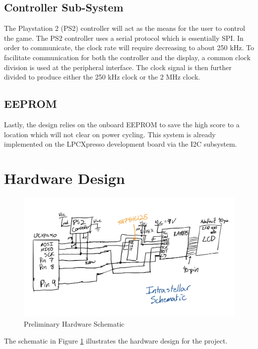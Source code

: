 \documentclass[a4paper, 12pt]{article}
\begin{document}
\subsection*{Controller Sub-System}
The Playstation 2 (PS2) controller will act as the means for the user to control the game. The PS2 controller uses a serial protocol which is essentially SPI. In order to communicate, the clock rate will require decreasing to about 250 kHz. To facilitate communication for both the controller and the display, a common clock division is used at the peripheral interface. The clock signal is then further divided to produce either the 250 kHz clock or the 2 MHz clock.

\subsection*{EEPROM}
Lastly, the design relies on the onboard EEPROM to save the high score to a location which will not clear on power cycling. This system is already implemented on the LPCXpresso development board via the I2C subsystem. 

\section*{Hardware Design}

\begin{figure}[h!]
  \centering
  \includegraphics[scale=.18]{schematic.png}
  \caption{Preliminary Hardware Schematic}
  \label{fig:schematic}
\end{figure}

The schematic in Figure \ref{fig:schematic} illustrates the hardware design for the project. 
\end{document}
